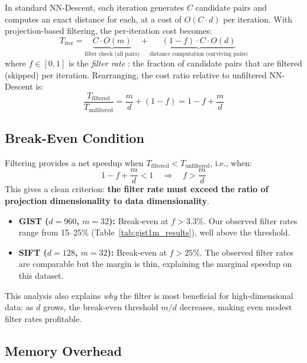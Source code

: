 In standard NN-Descent, each iteration generates $C$ candidate pairs and computes an exact distance for each, at a cost of $O(C \cdot d)$ per iteration.
With projection-based filtering, the per-iteration cost becomes:
\begin{equation}
    T_{\text{iter}} = \underbrace{C \cdot O(m)}_{\text{filter check (all pairs)}} + \underbrace{(1 - f) \cdot C \cdot O(d)}_{\text{distance computation (surviving pairs)}}
    \label{eq:iter_cost}
\end{equation}
where $f \in [0, 1]$ is the \emph{filter rate} : the fraction of candidate pairs that are filtered (skipped) per iteration.
Rearranging, the cost ratio relative to unfiltered NN-Descent is:
\begin{equation}
    \frac{T_{\text{filtered}}}{T_{\text{unfiltered}}} = \frac{m}{d} + (1 - f) = 1 - f + \frac{m}{d}
    \label{eq:cost_ratio}
\end{equation}

\subsection{Break-Even Condition}
\label{sec:breakeven}

Filtering provides a net speedup when $T_{\text{filtered}} < T_{\text{unfiltered}}$, i.e., when:
\begin{equation}
    1 - f + \frac{m}{d} < 1 \quad \Longrightarrow \quad f > \frac{m}{d}
    \label{eq:breakeven}
\end{equation}
This gives a clean criterion: \textbf{the filter rate must exceed the ratio of projection dimensionality to data dimensionality}.

\begin{itemize}
    \item \textbf{GIST ($d = 960$, $m = 32$):} Break-even at $f > 3.3\%$. Our observed filter rates range from 15--25\% (Table~\ref{tab:gist1m_results}), well above the threshold.
    \item \textbf{SIFT ($d = 128$, $m = 32$):} Break-even at $f > 25\%$. The observed filter rates are comparable but the margin is thin, explaining the marginal speedup on this dataset.
\end{itemize}

This analysis also explains \emph{why} the filter is most beneficial for high-dimensional data: as $d$ grows, the break-even threshold $m/d$ decreases, making even modest filter rates profitable.

\subsection{Memory Overhead}
\label{sec:memory}

